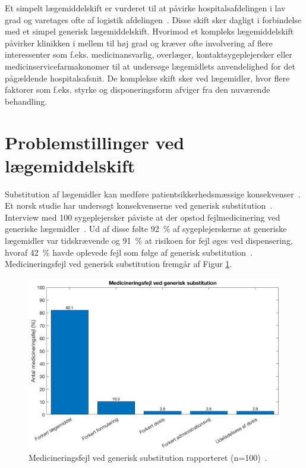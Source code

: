 Et simpelt lægemiddelskift er vurderet til at påvirke hospitalsafdelingen i lav grad og varetages ofte af logistik afdelingen~\citep{Laegemiddelinformaion2017, Sygehusapoteket2017a}. Disse skift sker dagligt i forbindelse med et simpel generisk lægemiddelskift. Hvorimod et kompleks lægemiddelskift påvirker klinikken i mellem til høj grad og kræver ofte involvering af flere interessenter som f.eks. medicinansvarlig, overlæger, kontaktsygeplejersker eller medicinservicefarmakonomer til at undersøge lægemidlets anvendelighed for det pågældende hospitalsafsnit. 
De komplekse skift sker ved lægemidler, hvor flere faktorer som f.eks. styrke og disponeringsform afviger fra den nuværende behandling.~\citep{Laegemiddelinformaion2017,Sygehusapoteket2017a}

\section{Problemstillinger ved lægemiddelskift} \label{sec:ProblemLaeg}
Substitution af lægemidler kan medføre patientsikkerhedsmæssige konsekvenser~\citep{DanskSelskabforPatientsikkerhed2009}. Et norsk studie har undersøgt konsekvenserne ved generisk substitution~\citep{Hakonsen2010}. Interview med 100 sygeplejersker påviste at der opstod fejlmedicinering ved generiske lægemidler~\citep{Hakonsen2010}. Ud af disse følte 92~\% af sygeplejerskerne at generiske lægemidler var tidskrævende og 91~\% at risikoen for fejl øges ved dispensering, hvoraf 42~\% havde oplevede fejl som følge af generisk substitution~\citep{Hakonsen2010}.
Medicineringsfejl ved generisk substitution fremgår af Figur \ref{fig:GeneriskSubstitution}.

\begin{figure}[H]\centering	\includegraphics[width=1\textwidth]{billeder/GenSub.png} 
	\caption{Medicineringsfejl ved generisk substitution rapporteret (n=100)~\citep{Hakonsen2010}.}
	\label{fig:GeneriskSubstitution}  
\end{figure}

